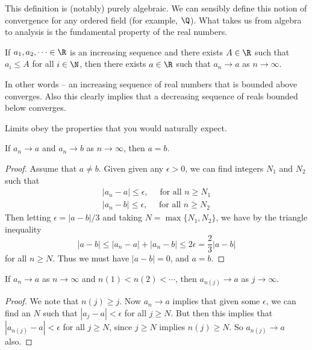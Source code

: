 \documentclass[a4paper]{scrartcl}
\begin{document}
This definition is (notably) purely algebraic. We can sensibly define this notion of convergence for any ordered field (for example, $\Q$). What takes us from algebra to analysis is the fundamental property of the real numbers.

\begin{axiomthm}
If $a_1, a_2, \dots \in \R$ is an increasing sequence and there exists $A \in \R$ such that $a_i \leq A$ for all $i \in \N$, then there exists $a \in \R$ such that $a_n \rightarrow a$ as $n \rightarrow \infty$.
\end{axiomthm}

In other words -- an increasing sequence of real numbers that is bounded above converges. Also this clearly implies that a decreasing sequence of reals bounded below converges.

Limits obey the properties that you would naturally expect.
 
\begin{proposition}
	If $a_n \rightarrow a$ and $a_n \rightarrow b$ as $n \rightarrow \infty$, then $a = b$.
\end{proposition}
\begin{proof}
	Assume that $a \neq b$. Given given any $\epsilon > 0$, we can find integers $N_1$ and $N_2$ such that
	\begin{align*}
		|a_n - a| \leq \epsilon, \quad \text{ for all $n \geq N_1$}\\
		|a_n - b| \leq \epsilon, \quad \text{ for all $n \geq N_2$}
	\end{align*}
	Then letting $\epsilon = |a - b|/3$ and taking $N = \max\{N_1, N_2\}$, we have by the triangle inequality
	$$
	|a - b| \leq |a_n - a| + |a_n - b| \leq 2\epsilon = \frac{2}{3} |a - b|
	$$
	for all $n \geq N$.
	Thus we must have $|a - b| = 0$, and $a = b$.
\end{proof}

\begin{proposition}
	If $a_n \rightarrow a$ as $n \rightarrow \infty$ and $n(1) < n(2) < \cdots$, then $a_{n(j)} \rightarrow a$ as $j \rightarrow \infty$.
\end{proposition}
\begin{proof}
	We note that $n(j) \geq j$. Now $a_n \rightarrow a$ implies that given some $\epsilon$, we can find an $N$ such that $|a_j - a| < \epsilon$ for all $j \geq N$. But then this implies that $|a_{n(j)} - a| < \epsilon$ for all $j \geq N$, since $j \geq N$ implies $n(j) \geq N$. So $a_{n(j)} \rightarrow a$ also.
\end{proof}
\end{document}
